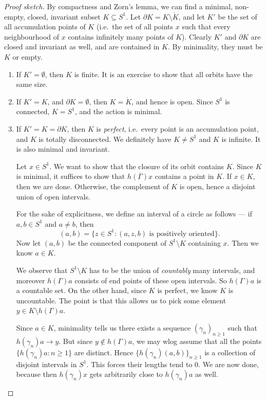 \documentclass[a4paper]{article}
\begin{document}
\begin{proof}[Proof sketch]
  By compactness and Zorn's lemma, we can find a minimal, non-empty, closed, invariant subset $K \subseteq S^1$. Let $\partial K = K \setminus \mathring{K}$, and let $K'$ be the set of all accumulation points of $K$ (i.e.\ the set of all points $x$ such that every neighbourhood of $x$ contains infinitely many points of $K$). Clearly $K'$ and $\partial K$ are closed and invariant as well, and are contained in $K$. By minimality, they must be $K$ or empty.

  \begin{enumerate}
    \item If $K' = \emptyset$, then $K$ is finite. It is an exercise to show that all orbits have the same size.
    \item If $K' = K$, and $\partial K = \emptyset$, then $K = \mathring{K}$, and hence is open. Since $S^1$ is connected, $K = S^1$, and the action is minimal.
    \item If $K' = K = \partial K$, then $K$ is \emph{perfect}, i.e.\ every point is an accumulation point, and $K$ is totally disconnected. We definitely have $K \not= S^1$ and $K$ is infinite. It is also minimal and invariant.

      Let $x \in S^1$. We want to show that the closure of its orbit contains $K$. Since $K$ is minimal, it suffices to show that $\overline{h(\Gamma)x}$ contains a point in $K$. If $x \in K$, then we are done. Otherwise, the complement of $K$ is open, hence a disjoint union of open intervals.

       For the sake of explicitness, we define an interval of a circle as follows --- if $a, b \in S^1$ and $a \not= b$, then 
      \[
        (a, b) = \{z \in S^1: (a, z, b)\text{ is positively oriented}\}.
      \]
      Now let $(a, b)$ be the connected component of $S^1 \setminus K$ containing $x$. Then we know $a \in K$.

      We observe that $S^1 \setminus K$ has to be the union of \emph{countably} many intervals, and moreover $h(\Gamma) a$ consists of end points of these open intervals. So $h(\Gamma) a$ is a countable set. On the other hand, since $K$ is perfect, we know $K$ is uncountable. The point is that this allows us to pick some element $y \in K \setminus h(\Gamma) a$.

      Since $a \in K$, minimality tells us there exists a sequence $(\gamma_n)_{n \geq 1}$ such that $h(\gamma_n) a \to y$. But since $y \not \in h(\Gamma) a$, we may wlog assume that all the points $\{h(\gamma_n)a : n \geq 1\}$ are distinct. Hence $\{h(\gamma_n)(a, b) \}_{n \geq 1}$ is a collection of disjoint intervals in $S^1$. This forces their lengths tend to $0$. We are now done, because then $h(\gamma_n) x$ gets arbitrarily close to $h(\gamma_n) a$ as well.
  \end{enumerate}
\end{proof}
\end{document}
